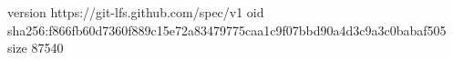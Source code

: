 version https://git-lfs.github.com/spec/v1
oid sha256:f866fb60d7360f889c15e72a83479775caa1c9f07bbd90a4d3c9a3c0babaf505
size 87540
